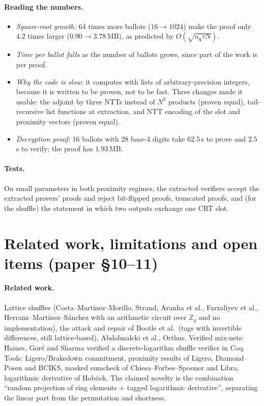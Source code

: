 \documentclass[11pt,a4paper]{article}
\newcommand{\Zq}{\mathbb{Z}_q}
\newcommand{\nq}{n_{\mathsf{q}}}
\theoremstyle{definition}
\theoremstyle{plain}
\begin{document}
\paragraph{Reading the numbers.}
\begin{itemize}[leftmargin=1.3em]
\item \emph{Square-root growth:} 64 times more ballots ($16\to1024$) make the proof only $4.2$ times larger
  ($0.90\to3.78$\,MB), as predicted by $O(\sqrt{\nq\tau N})$.
\item \emph{Time per ballot falls} as the number of ballots grows, since part of the work is per proof.
\item \emph{Why the code is slow:} it computes with lists of arbitrary-precision integers, because it is
  written to be proven, not to be fast. Three changes made it usable: the adjoint by three NTTs instead
  of $N^2$ products (proven equal), tail-recursive list functions at extraction, and NTT encoding of the
  slot and proximity vectors (proven equal).
\item \emph{Decryption proof:} 16 ballots with 28 base-4 digits take $62.5$\,s to prove and $2.5$\,s to
  verify; the proof has $1.93$\,MB.
\end{itemize}

\paragraph{Tests.} On small parameters in both proximity regimes, the extracted verifiers accept the
extracted provers' proofs and reject bit-flipped proofs, truncated proofs, and (for the shuffle) the
statement in which two outputs exchange one CRT slot.

\section{Related work, limitations and open items (paper \S10--11)}
\label{sec:limits}

\paragraph{Related work.} Lattice shuffles (Costa--Mart\'inez--Morillo, Strand, Aranha et al., Farzaliyev
et al., Herranz--Mart\'inez--S\'anchez with an arithmetic circuit over $\Zq$ and no implementation), the attack
and repair of Bootle et al.\ (tags with invertible differences, still lattice-based), Abdolmaleki et al.,
Orthus. Verified mix-nets: Haines, Gor\'e and Sharma verified a discrete-logarithm shuffle verifier in Coq.
Tools: Ligero/Brakedown commitment, proximity results of Ligero, Diamond--Posen and BCIKS, masked sumcheck of
Chiesa--Forbes--Spooner and Libra, logarithmic derivative of Hab\"ock. The claimed novelty is the combination
``random projection of ring elements + tagged logarithmic derivative'', separating the linear part from the
permutation and shortness.
\end{document}
